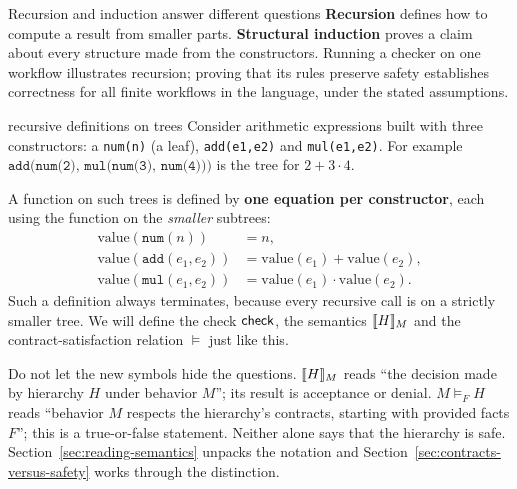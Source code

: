 \begin{warning}{Recursion and induction answer different questions}
\textbf{Recursion} defines how to compute a result from smaller parts.
\textbf{Structural induction} proves a claim about every structure made from the constructors. Running a checker on one workflow illustrates recursion; proving that its rules preserve safety establishes correctness for all finite workflows in the language, under the stated assumptions.
\end{warning}

\begin{toolbox}{recursive definitions on trees}
Consider arithmetic expressions built with three constructors: a \texttt{num(n)} (a leaf), \texttt{add(e1,e2)} and \texttt{mul(e1,e2)}. For example $\texttt{add(num(2), mul(num(3), num(4)))}$ is the tree for $2+3\cdot4$.

A function on such trees is defined by \textbf{one equation per constructor}, each using the function on the \emph{smaller} subtrees:
\begin{align*}
\mathrm{value}(\texttt{num}(n)) &= n,\\
\mathrm{value}(\texttt{add}(e_1,e_2)) &= \mathrm{value}(e_1)+\mathrm{value}(e_2),\\
\mathrm{value}(\texttt{mul}(e_1,e_2)) &= \mathrm{value}(e_1)\cdot\mathrm{value}(e_2).
\end{align*}
Such a definition always terminates, because every recursive call is on a strictly smaller tree. We will define the check $\mathsf{check}$, the semantics $\llbracket H\rrbracket_{M}$ and the contract-satisfaction relation $\models$ just like this.

Do not let the new symbols hide the questions. $\llbracket H\rrbracket_{M}$ reads ``the decision made by hierarchy $H$ under behavior $M$''; its result is acceptance or denial. $M\models_F H$ reads ``behavior $M$ respects the hierarchy's contracts, starting with provided facts $F$''; this is a true-or-false statement. Neither alone says that the hierarchy is safe. Section~\ref{sec:reading-semantics} unpacks the notation and Section~\ref{sec:contracts-versus-safety} works through the distinction.
\end{toolbox}

